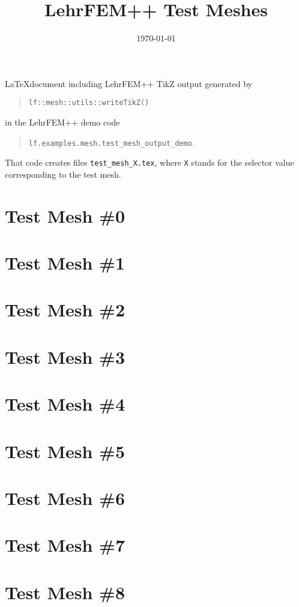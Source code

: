 \documentclass[a4wide]{article}
\title{LehrFEM++ Test Meshes}
\date{\today}
\begin{document}
\maketitle

\noindent
\LaTeX document including LehrFEM++ TikZ output generated by
\begin{quote}
  \texttt{lf::mesh::utils::writeTikZ()}
\end{quote}
in the LehrFEM++ demo code
\begin{quote}
  \texttt{lf.examples.mesh.test\_mesh\_output\_demo}.
\end{quote}
That code creates
files \texttt{test\_mesh\_X.tex}, where \texttt{X} stands for the
selector value corresponding to the test mesh.

\section*{Test Mesh \#0}

\resizebox{\linewidth}{!}{}

\section*{Test Mesh \#1}

\resizebox{\linewidth}{!}{}

\section*{Test Mesh \#2}

\resizebox{\linewidth}{!}{}

\section*{Test Mesh \#3}

\resizebox{\linewidth}{!}{}

\section*{Test Mesh \#4}

\resizebox{\linewidth}{!}{}

\section*{Test Mesh \#5}

\resizebox{\linewidth}{!}{}

\section*{Test Mesh \#6}

\resizebox{\linewidth}{!}{}

\section*{Test Mesh \#7}

\resizebox{\linewidth}{!}{}

\section*{Test Mesh \#8}

\resizebox{\linewidth}{!}{}
\end{document}
